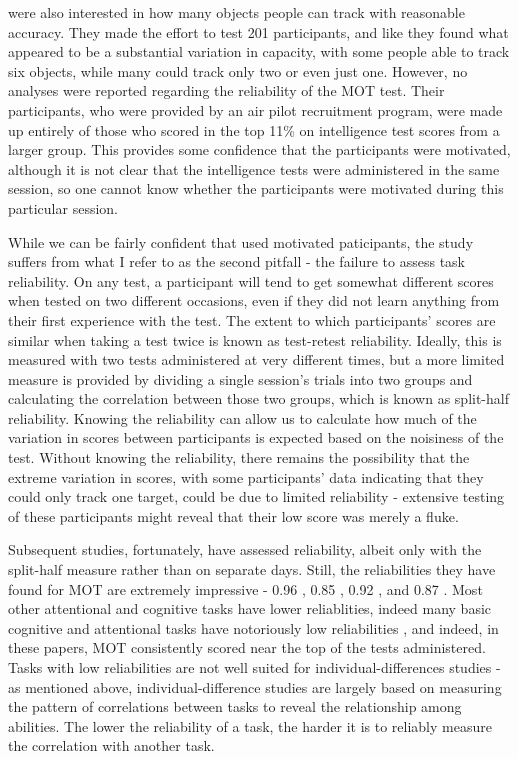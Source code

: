 \documentclass[
]{book}
\begin{document}
\citet{oksamaMultipleObjectTracking2004} were also interested in how many objects people can track with reasonable accuracy. They made the effort to test 201 participants, and like \citet{meyerhoffIndividualDifferencesVisual2020} they found what appeared to be a substantial variation in capacity, with some people able to track six objects, while many could track only two or even just one. However, no analyses were reported regarding the reliability of the MOT test. Their participants, who were provided by an air pilot recruitment program, were made up entirely of those who scored in the top 11\% on intelligence test scores from a larger group. This provides some confidence that the participants were motivated, although it is not clear that the intelligence tests were administered in the same session, so one cannot know whether the participants were motivated during this particular session.

While we can be fairly confident that \citet{oksamaMultipleObjectTracking2004} used motivated paticipants, the study suffers from what I refer to as the second pitfall - the failure to assess task reliability. On any test, a participant will tend to get somewhat different scores when tested on two different occasions, even if they did not learn anything from their first experience with the test. The extent to which participants' scores are similar when taking a test twice is known as test-retest reliability. Ideally, this is measured with two tests administered at very different times, but a more limited measure is provided by dividing a single session's trials into two groups and calculating the correlation between those two groups, which is known as split-half reliability. Knowing the reliability can allow us to calculate how much of the variation in scores between participants is expected based on the noisiness of the test. Without knowing the reliability, there remains the possibility that the extreme variation in scores, with some participants' data indicating that they could only track one target, could be due to limited reliability - extensive testing of these participants might reveal that their low score was merely a fluke.

Subsequent studies, fortunately, have assessed reliability, albeit only with the split-half measure rather than on separate days. Still, the reliabilities they have found for MOT are extremely impressive - 0.96 \citep{huangMeasuringInterrelationsMultiple2012}, 0.85 \citep{wilbiksIndividualDifferencesMultiple2020}, 0.92 \citep{trevinoBridgingCognitiveNeuropsychological2021}, and 0.87 \citep{eayrsEstablishingIndividualDifferences2018}. Most other attentional and cognitive tasks have lower reliablities, indeed many basic cognitive and attentional tasks have notoriously low reliabilities \citep{hedgeReliabilityParadoxWhy2018}, and indeed, in these papers, MOT consistently scored near the top of the tests administered. Tasks with low reliabilities are not well suited for individual-differences studies - as mentioned above, individual-difference studies are largely based on measuring the pattern of correlations between tasks to reveal the relationship among abilities. The lower the reliability of a task, the harder it is to reliably measure the correlation with another task.
\end{document}
